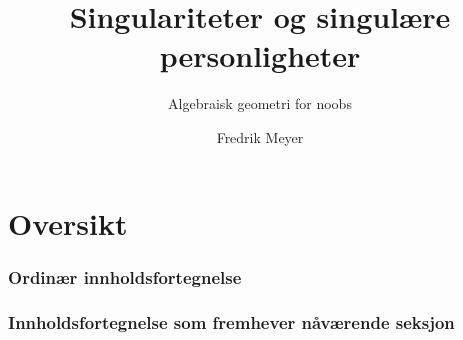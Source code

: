 \documentclass[norsk]{beamer}
\author{Fredrik Meyer}
\title{Singulariteter og singulære {personligheter}}
\subtitle{Algebraisk geometri for noobs}
\begin{document}
   
\section{Oversikt}

%
%

\begin{frame}
    \frametitle{Ordinær innholdsfortegnelse}
    \tableofcontents
\end{frame}

\begin{frame}
    \frametitle{Innholdsfortegnelse som fremhever nåværende seksjon}
    \tableofcontents[currentsection]
\end{frame}
\end{document}
